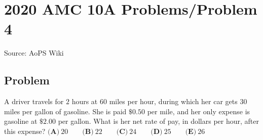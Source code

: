 \documentclass[12pt]{article}
\begin{document}
\section*{{2020 AMC 10A Problems/Problem 4}}
Source: AoPS Wiki

\subsection*{Problem}
A driver travels for $2$ hours at $60$ miles per hour, during which her car gets $30$ miles per gallon of gasoline. She is paid $\$0.50$ per mile, and her only expense is gasoline at $\$2.00$ per gallon. What is her net rate of pay, in dollars per hour, after this expense? $\textbf{(A)}\ 20\qquad\textbf{(B)}\ 22\qquad\textbf{(C)}\ 24\qquad\textbf{(D)}\ 25\qquad\textbf{(E)}\ 26$
\end{document}
